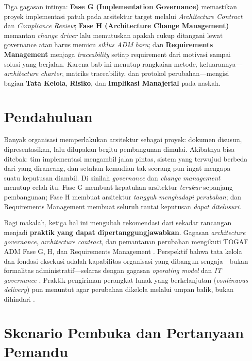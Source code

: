 Tiga gagasan intinya: \textbf{Fase G (Implementation Governance)} memastikan proyek
implementasi patuh pada arsitektur target melalui \emph{Architecture Contract} dan
\emph{Compliance Review}; \textbf{Fase H (Architecture Change Management)} memantau
\emph{change driver} lalu memutuskan apakah cukup ditangani lewat governance atau
harus memicu \emph{siklus ADM baru}; dan \textbf{Requirements Management} menjaga
\emph{traceability} setiap requirement dari motivasi sampai solusi yang berjalan.
Karena bab ini menutup rangkaian metode, keluarannya---\emph{architecture charter},
matriks traceability, dan protokol perubahan---mengisi bagian \textbf{Tata Kelola},
\textbf{Risiko}, dan \textbf{Implikasi Manajerial} pada naskah.

\section{Pendahuluan}

Banyak organisasi memperlakukan arsitektur sebagai proyek: dokumen disusun,
dipresentasikan, lalu dilupakan begitu pembangunan dimulai. Akibatnya bisa
ditebak: tim implementasi mengambil jalan pintas, sistem yang terwujud berbeda
dari yang dirancang, dan setahun kemudian tak seorang pun ingat mengapa suatu
keputusan diambil. Di sinilah \emph{governance} dan \emph{change management}
menutup celah itu. Fase G membuat kepatuhan arsitektur \emph{terukur} sepanjang
pembangunan; Fase H membuat arsitektur \emph{tangguh menghadapi perubahan}; dan
Requirements Management membuat seluruh rantai keputusan \emph{dapat ditelusuri}.

Bagi makalah, ketiga hal ini mengubah rekomendasi dari sekadar rancangan menjadi
\textbf{praktik yang dapat dipertanggungjawabkan}. Gagasan \emph{architecture
governance}, \emph{architecture contract}, dan pemantauan perubahan mengikuti
TOGAF ADM Fase G, H, dan Requirements Management \cite{togaf10}. Perspektif bahwa
tata kelola dan fondasi eksekusi adalah kapabilitas organisasi yang dibangun
sengaja---bukan formalitas administratif---selaras dengan gagasan \emph{operating
model} dan \emph{IT governance} \cite{ross2006enterprise,ross2019designed}. Praktik
pengiriman perangkat lunak yang berkelanjutan (\emph{continuous delivery}) pun
menuntut agar perubahan dikelola melalui umpan balik, bukan dihindari
\cite{newman2021building}.

\section{Skenario Pembuka dan Pertanyaan Pemandu}

